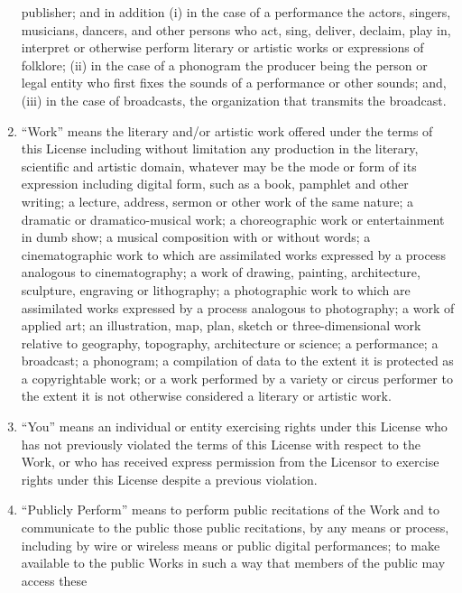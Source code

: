 \begin{enumerate}
       publisher; and in addition (i) in the case of a performance the
       actors, singers, musicians, dancers, and other persons who act,
       sing, deliver, declaim, play in, interpret or otherwise perform
       literary or artistic works or expressions of folklore; (ii) in
       the case of a phonogram the producer being the person or legal
       entity who first fixes the sounds of a performance or other
       sounds; and, (iii) in the case of broadcasts, the organization
       that transmits the broadcast.
 \item ``Work'' means the literary and/or artistic work offered under
       the terms of this License including without limitation any
       production in the literary, scientific and artistic domain,
       whatever may be the mode or form of its expression including
       digital form, such as a book, pamphlet and other writing; a
       lecture, address, sermon or other work of the same nature; a
       dramatic or dramatico-musical work; a choreographic work or
       entertainment in dumb show; a musical composition with or without
       words; a cinematographic work to which are assimilated works
       expressed by a process analogous to cinematography; a work of
       drawing, painting, architecture, sculpture, engraving or
       lithography; a photographic work to which are assimilated works
       expressed by a process analogous to photography; a work of
       applied art; an illustration, map, plan, sketch or
       three-dimensional work relative to geography, topography,
       architecture or science; a performance; a broadcast; a phonogram;
       a compilation of data to the extent it is protected as a
       copyrightable work; or a work performed by a variety or circus
       performer to the extent it is not otherwise considered a literary
       or artistic work.
 \item ``You'' means an individual or entity exercising rights under
       this License who has not previously violated the terms of this
       License with respect to the Work, or who has received express
       permission from the Licensor to exercise rights under this
       License despite a previous violation.
 \item ``Publicly Perform'' means to perform public recitations of the
       Work and to communicate to the public those public recitations,
       by any means or process, including by wire or wireless means or
       public digital performances; to make available to the public
       Works in such a way that members of the public may access these

\end{enumerate}
